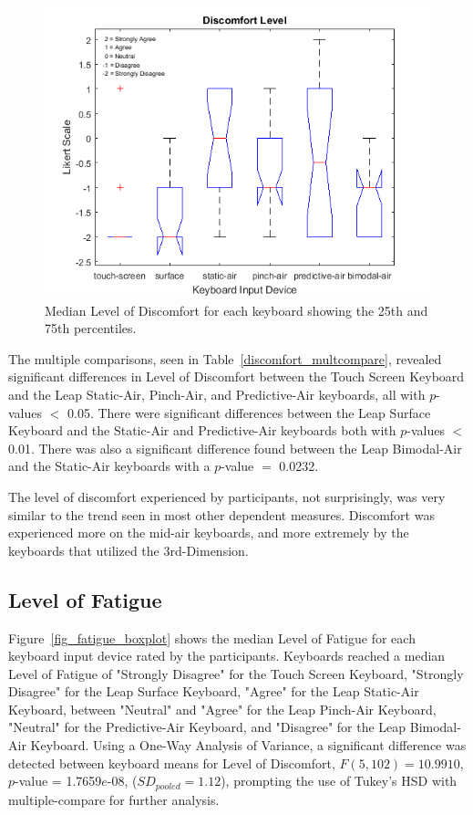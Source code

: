 \begin{figure}[h]
	\centering
	\includegraphics{fig_discomfort_boxplot}
	\caption[Level of Discomfort Boxplot]{Median Level of Discomfort for each keyboard showing the 25th and 75th percentiles.}
	\label{fig_discomfort_boxplot}
\end{figure}

The multiple comparisons, seen in Table~\ref{discomfort_multcompare}, revealed significant differences in Level of Discomfort between the Touch Screen Keyboard and the Leap Static-Air, Pinch-Air, and Predictive-Air keyboards, all with $p$-values $<$ 0.05. There were significant differences between the Leap Surface Keyboard and the Static-Air and Predictive-Air keyboards both with $p$-values $<$ 0.01. There was also a significant difference found between the Leap Bimodal-Air and the Static-Air keyboards with a $p$-value $=$ 0.0232.

The level of discomfort experienced by participants, not surprisingly, was very similar to the trend seen in most other dependent measures. Discomfort was experienced more on the mid-air keyboards, and more extremely by the keyboards that utilized the 3rd-Dimension.

\subsection{Level of Fatigue}
Figure~\ref{fig_fatigue_boxplot} shows the median Level of Fatigue for each keyboard input device rated by the participants. Keyboards reached a median Level of Fatigue of "Strongly Disagree" for the Touch Screen Keyboard, "Strongly Disagree" for the Leap Surface Keyboard, "Agree" for the Leap Static-Air Keyboard, between "Neutral" and "Agree" for the Leap Pinch-Air Keyboard, "Neutral" for the Predictive-Air Keyboard, and "Disagree" for the Leap Bimodal-Air Keyboard. Using a One-Way Analysis of Variance, a significant difference was detected between keyboard means for Level of Discomfort, $F(5, 102) = 10.9910$, $p$-value = 1.7659$e$-08, ($SD_{pooled} = 1.12$), prompting the use of Tukey's HSD with multiple-compare for further analysis.

